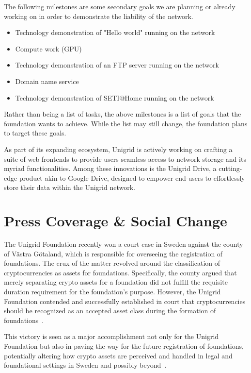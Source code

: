 \documentclass[a4paper,oneside]{article}
\begin{document}
\noindent The following milestones are some secondary goals we are planning or already working on in order to demonstrate the liability of the network.
\begin{itemize}
  \item Technology demonstration of "Hello world" running on the network
  \item Compute work (GPU)
  \item Technology demonstration of an FTP server running on the network
  \item Domain name service
  \item Technology demonstration of SETI@Home running on the network
\end{itemize}

\noindent Rather than being a list of tasks, the above milestones is a list of goals that the foundation wants to achieve. While the list may still change, the foundation plans to target these goals.

As part of its expanding ecosystem, Unigrid is actively working on crafting a suite of web frontends to provide users seamless access to network storage and its myriad functionalities. Among these innovations is the Unigrid Drive, a cutting-edge product akin to Google Drive, designed to empower end-users to effortlessly store their data within the Unigrid network.

\section{Press Coverage \& Social Change}
The Unigrid Foundation recently won a court case in Sweden against the county of Västra Götaland, which is responsible for overseeing the registration of foundations. The crux of the matter revolved around the classification of cryptocurrencies as assets for foundations. Specifically, the county argued that merely separating crypto assets for a foundation did not fulfill the requisite duration requirement for the foundation's purpose. However, the Unigrid Foundation contended and successfully established in court that cryptocurrencies should be recognized as an accepted asset class during the formation of foundations~\cite{decentralized-internet,linkedin-paulk,linkedin-valuexag}.

This victory is seen as a major accomplishment not only for the Unigrid Foundation but also in paving the way for the future registration of foundations, potentially altering how crypto assets are perceived and handled in legal and foundational settings in Sweden and possibly beyond~\cite{linkedin-valuexag}.
\end{document}
